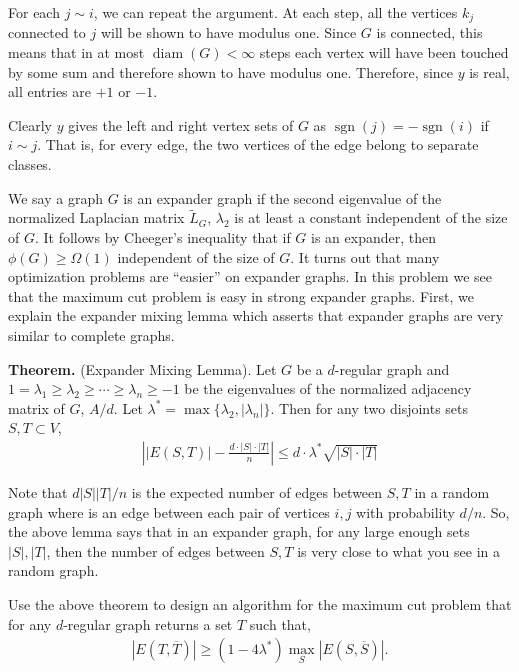 \documentclass[10pt]{article}
\newcommand{\sgn}{\operatorname{sgn}}
\begin{document}
\begin{solution}[Solution]
    For each \( j\sim i \), we can repeat the argument. At each step, all the vertices \( k_j \) connected to \( j \) will be shown to have modulus one. Since \( G \) is connected, this means that in at most \( \operatorname{diam}(G) < \infty \) steps each vertex will have been touched by some sum and therefore shown to have modulus one. Therefore, since \( y \) is real, all entries are \( +1 \) or \( -1 \).

    Clearly \( y \) gives the left and right vertex sets of \( G \) as \( \sgn(j) = -\sgn(i) \) if \( i\sim j \). That is, for every edge, the two vertices of the edge belong to separate classes.

\end{solution}

\begin{problem}[Problem 2]
    We say a graph \( G \) is an expander graph if the second eigenvalue of the normalized Laplacian matrix \( \tilde{L}_G \), \( \lambda_2 \) is at least a constant independent of the size of \( G \). It follows by Cheeger’s inequality that if \( G \) is an expander, then \( \phi(G) \geq  \Omega(1) \) independent of the size of \( G \). It turns out that many optimization problems are ``easier'' on expander graphs. In this problem we see that the maximum cut problem is easy in strong expander graphs. First, we explain the expander mixing lemma which asserts that expander graphs are very similar to complete graphs.

    \textbf{Theorem.} (Expander Mixing Lemma). Let \( G \) be a \( d \)-regular graph and \( 1=\lambda_1 \geq \lambda_2 \geq \cdots \geq \lambda_n \geq -1 \) be the eigenvalues of the normalized adjacency matrix of \( G \), \( A/d \). Let \( \lambda^* = \max\{ \lambda_2, |\lambda_n| \} \). Then for any two disjoints sets \( S,T\subset V \),
    \begin{align*}
        \left| |E(S,T)| - \frac{d\cdot|S|\cdot |T|}{n} \right| \leq d\cdot \lambda^* \sqrt{|S|\cdot|T|}
    \end{align*}
    
    Note that \( d|S||T|/n \) is the expected number of edges between \( S, T \) in a random graph where is an edge between each pair of vertices \( i, j \) with probability \( d/n \). So, the above lemma says that in an expander graph, for any large enough sets \( |S|, |T| \), then the number of edges between \( S , T \) is very close to what you see in a random graph.

    Use the above theorem to design an algorithm for the maximum cut problem that for any \( d \)-regular graph returns a set \( T \) such that,
    \begin{align*}
        |E(T,\overline{T})| \geq (1-4 \lambda^*)\max_S|E(S,\overline{S})|.
    \end{align*}
    

\end{problem}
\end{document}
